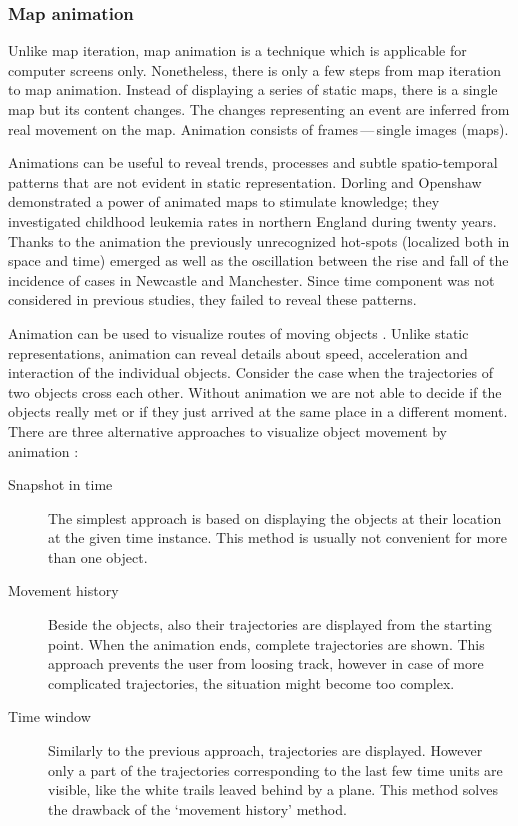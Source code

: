 \documentclass[a4paper,12pt]{book}
\begin{document}

\subsubsection{Map animation}
Unlike map iteration, map animation is a technique which is applicable for computer screens only.
Nonetheless, there is only a few steps from map iteration to map animation.
Instead of displaying a series of static maps, there is a single map but its content changes.
The changes representing an event are inferred from real movement on the map.
Animation consists of frames\,---\,single images (maps).

Animations can be useful to reveal trends, processes and subtle spatio-temporal patterns
that are not evident in static representation. Dorling and Openshaw \cite{dorling1993using}
demonstrated a power of animated maps to stimulate knowledge;
they investigated childhood leukemia rates in northern England during twenty years.
Thanks to the animation the previously unrecognized hot-spots (localized both in space and time) emerged
as well as the oscillation between the rise and fall of the incidence of
cases in Newcastle and Manchester. Since time component was not considered in previous studies,
they failed to reveal these patterns.

Animation can be used to visualize routes of moving objects \cite{andrienko2003exploratory}.
Unlike static representations, animation can reveal details about speed, acceleration and interaction
of the individual objects. Consider the case when the trajectories of two objects cross each other.
Without animation we are not able to decide if the objects really met or
if they just arrived at the same place in a different moment.
There are three alternative approaches to visualize object movement by animation \cite{andrienko2003exploratory}:
    \begin{description}
        \item[Snapshot in time] The simplest approach is based on displaying the objects
        at their location at the given time instance. This method is usually not convenient for more than one object.
        \item[Movement history] Beside the objects, also their trajectories are displayed from the starting point.
        When the animation ends, complete trajectories are shown. This approach prevents the user from loosing track,
        however in case of more complicated trajectories, the situation might become too complex.
        \item[Time window] Similarly to the previous approach, trajectories are displayed.
        However only a part of the trajectories corresponding to the last few time units are visible,
        like the white trails leaved behind by a plane.
        This method solves the drawback of the `movement history' method.
    \end{description}
\end{document}
